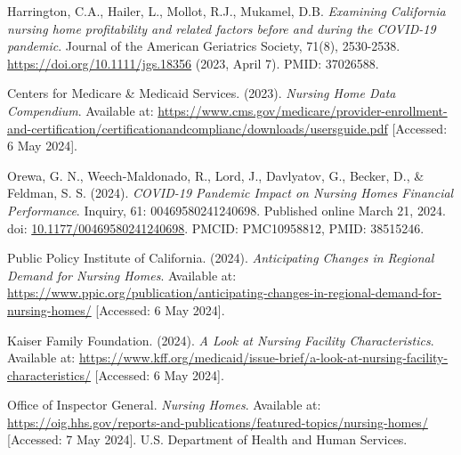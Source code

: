 \documentclass{article}
\theoremstyle{mytheoremstyle}
\theoremstyle{mytheoremstyle}
\theoremstyle{myproblemstyle}
\begin{document}
\begin{thebibliography}{9}
Harrington, C.A., Hailer, L., Mollot, R.J., Mukamel, D.B. 
\textit{Examining California nursing home profitability and related factors before and during the COVID-19 pandemic}.
Journal of the American Geriatrics Society, 71(8), 2530-2538. 
\url{https://doi.org/10.1111/jgs.18356} (2023, April 7). PMID: 37026588.

Centers for Medicare \& Medicaid Services. (2023).
\textit{Nursing Home Data Compendium}.
Available at: \url{https://www.cms.gov/medicare/provider-enrollment-and-certification/certificationandcomplianc/downloads/usersguide.pdf} [Accessed: 6 May 2024].

Orewa, G. N., Weech-Maldonado, R., Lord, J., Davlyatov, G., Becker, D., \& Feldman, S. S. (2024).
\textit{COVID-19 Pandemic Impact on Nursing Homes Financial Performance}.
Inquiry, 61: 00469580241240698. Published online March 21, 2024. doi: \href{https://doi.org/10.1177/00469580241240698}{10.1177/00469580241240698}.
PMCID: PMC10958812, PMID: 38515246.

Public Policy Institute of California. (2024).
\textit{Anticipating Changes in Regional Demand for Nursing Homes}.
Available at: \url{https://www.ppic.org/publication/anticipating-changes-in-regional-demand-for-nursing-homes/} [Accessed: 6 May 2024].

Kaiser Family Foundation. (2024).
\textit{A Look at Nursing Facility Characteristics}.
Available at: \url{https://www.kff.org/medicaid/issue-brief/a-look-at-nursing-facility-characteristics/} [Accessed: 6 May 2024].

Office of Inspector General.
\textit{Nursing Homes}.
Available at: \url{https://oig.hhs.gov/reports-and-publications/featured-topics/nursing-homes/} [Accessed: 7 May 2024].
U.S. Department of Health and Human Services.

\end{thebibliography}


\end{document}
